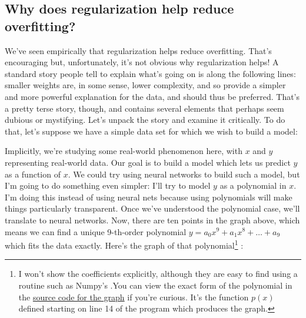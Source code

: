 \documentclass[a4paper,twoside,10pt]{book}
\begin{document}
\subsection{Why does regularization help reduce overfitting?}
We've seen empirically that regularization helps reduce overfitting. That's encouraging but, unfortunately, it's not obvious why regularization helps! A standard story people tell to explain what's going on is along the following lines: smaller weights are, in some sense, lower complexity, and so provide a simpler and more powerful explanation for the data, and should thus be preferred. That's a pretty terse story, though, and contains several elements that perhaps seem dubious or mystifying. Let's unpack the story and examine it critically. To do that, let's suppose we have a simple data set for which we wish to build a model:
\begin{center}
\end{center}
Implicitly, we're studying some real-world phenomenon here, with $x$ and $y$ representing real-world data. Our goal is to build a model which lets us predict $y$ as a function of $x$. We could try using neural networks to build such a model, but I'm going to do something even simpler: I'll try to model $y$ as a polynomial in $x$. I'm doing this instead of using neural nets because using polynomials will make things particularly transparent. Once we've understood the polynomial case, we'll translate to neural networks. Now, there are ten points in the graph above, which means we can find a unique 9-th-order polynomial $y=a_0x^9+a_1x^8+\ldots+a_9$ which fits the data exactly. Here's the graph of that polynomial\footnote{I won't show the coefficients explicitly, although they are easy to find using a routine such as Numpy's .You can view the exact form of the polynomial in the \href{http://neuralnetworksanddeeplearning.com/js/polynomial_model.js}{source code for the graph} if you're curious. It's the function $p(x)$ defined starting on line 14 of the program which produces the graph.} :
\end{document}
